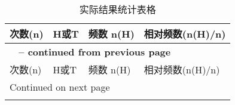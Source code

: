 \documentclass[utf8]{article}
\begin{document}
\begin{longtable}{|l|l|l|l|}
    \caption[]{实际结果统计表格} \\

    \hline 次数(n) & H或T & 频数 n(H) & 相对频数(n(H)/n) \\ \hline
    \endfirsthead

    \multicolumn{4}{l}{{\bfseries \tablename\ \thetable{} -- continued from previous page}} \\
    \hline 次数(n) & H或T & 频数 n(H) & 相对频数(n(H)/n) \\ \hline
    \endhead

    \hline \multicolumn{4}{l}{{Continued on next page}} \\ \hline
    \endfoot

    \hline
    \endlastfoot


\end{longtable}
\end{document}
